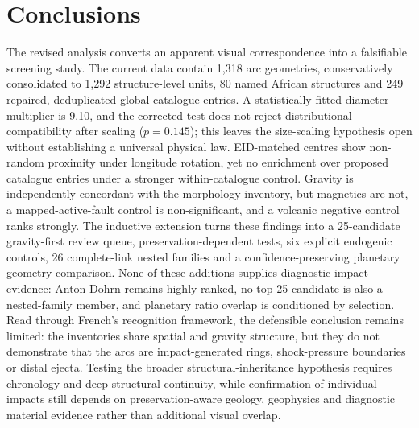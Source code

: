 \documentclass[11pt]{article}
\begin{document}
\section{Conclusions}
The revised analysis converts an apparent visual correspondence into a falsifiable screening study. The current data contain 1,318 arc geometries, conservatively consolidated to 1,292 structure-level units, 80 named African structures and 249 repaired, deduplicated global catalogue entries. A statistically fitted diameter multiplier is 9.10, and the corrected test does not reject distributional compatibility after scaling ($p=0.145$); this leaves the size-scaling hypothesis open without establishing a universal physical law. EID-matched centres show non-random proximity under longitude rotation, yet no enrichment over proposed catalogue entries under a stronger within-catalogue control. Gravity is independently concordant with the morphology inventory, but magnetics are not, a mapped-active-fault control is non-significant, and a volcanic negative control ranks strongly. The inductive extension turns these findings into a 25-candidate gravity-first review queue, preservation-dependent tests, six explicit endogenic controls, 26 complete-link nested families and a confidence-preserving planetary geometry comparison. None of these additions supplies diagnostic impact evidence: Anton Dohrn remains highly ranked, no top-25 candidate is also a nested-family member, and planetary ratio overlap is conditioned by selection. Read through French's recognition framework, the defensible conclusion remains limited: the inventories share spatial and gravity structure, but they do not demonstrate that the arcs are impact-generated rings, shock-pressure boundaries or distal ejecta. Testing the broader structural-inheritance hypothesis requires chronology and deep structural continuity, while confirmation of individual impacts still depends on preservation-aware geology, geophysics and diagnostic material evidence rather than additional visual overlap.
\end{document}
